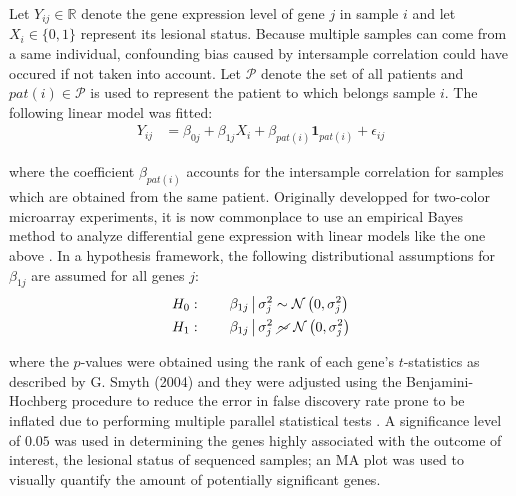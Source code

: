 \documentclass[journal, a4paper]{IEEEtran}
\def\one{\mathbf{1}}
\begin{document}
Let $Y_{ij} \in \mathbb{R}$ denote the gene expression level of gene $j$ in sample $i$ and let $X_i \in \{0, 1\}$ represent its lesional status. Because multiple samples can come from a same individual, confounding bias caused by intersample correlation could have occured if not taken into account. Let $\mathcal{P}$ denote the set of all patients and $pat(i) \in \mathcal{P}$ is used to represent the patient to which belongs sample $i$. The following linear model was fitted:
\begin{align*}
  Y_{ij} &=\beta_{0j} + \beta_{1j}X_i + \beta_{pat(i)}\one_{pat(i)} + \epsilon_{ij}
\end{align*}

\noindent where the coefficient $\beta_{pat(i)}$ accounts for the intersample correlation for samples which are obtained from the same patient. Originally developped for two-color microarray experiments, it is now commonplace to use an empirical Bayes method to analyze differential gene expression with linear models like the one above \cite{smyth2004linear}. In a hypothesis framework, the following distributional assumptions for $\beta_{1j}$ are assumed for all genes $j$:
\begin{align*}
  H_0:\qquad \beta_{1j} \,\big\vert\, \sigma^2_j &\sim \mathcal{N}\left(0, \sigma^2_j\right)\\
  H_1:\qquad \beta_{1j} \,\big\vert\, \sigma^2_j &\,\,\cancel{\sim}\,\, \mathcal{N}\left(0, \sigma^2_j\right)
\end{align*}

\noindent where the $p$-values were obtained using the rank of each gene's $t$-statistics as described by G. Smyth (2004) and they were adjusted using the Benjamini-Hochberg procedure to reduce the error in false discovery rate prone to be inflated due to performing multiple parallel statistical tests \cite{smyth2004linear, benjamini2010discovering}. A significance level of $0.05$ was used in determining the genes highly associated with the outcome of interest, the lesional status of sequenced samples; an MA plot was used to visually quantify the amount of potentially significant genes.\\
\end{document}
